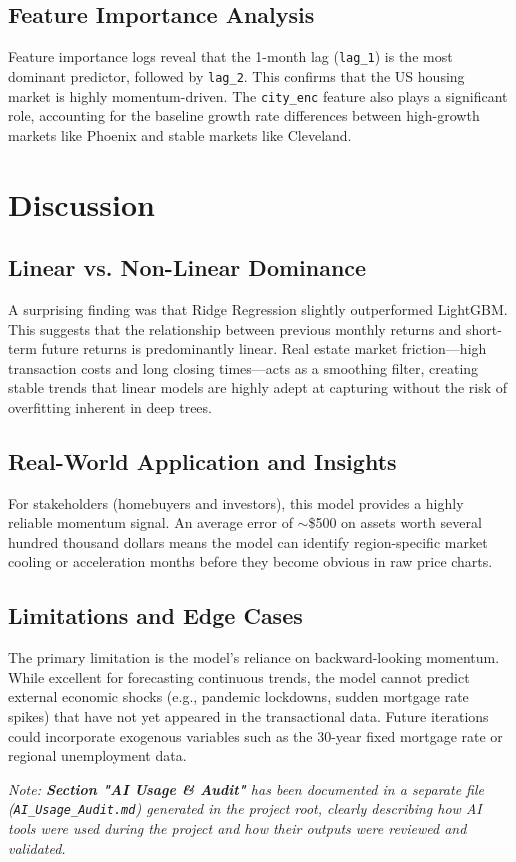 \documentclass[11pt,a4paper]{article}
\begin{document}
\subsection{Feature Importance Analysis}
Feature importance logs reveal that the 1-month lag (\texttt{lag\_1}) is the most dominant predictor, followed by \texttt{lag\_2}. This confirms that the US housing market is highly momentum-driven. The \texttt{city\_enc} feature also plays a significant role, accounting for the baseline growth rate differences between high-growth markets like Phoenix and stable markets like Cleveland.

\section{Discussion}
\label{sec:discussion}
\subsection{Linear vs. Non-Linear Dominance}
A surprising finding was that Ridge Regression slightly outperformed LightGBM. This suggests that the relationship between previous monthly returns and short-term future returns is predominantly linear. Real estate market friction---high transaction costs and long closing times---acts as a smoothing filter, creating stable trends that linear models are highly adept at capturing without the risk of overfitting inherent in deep trees.

\subsection{Real-World Application and Insights}
For stakeholders (homebuyers and investors), this model provides a highly reliable momentum signal. An average error of $\sim$\$500 on assets worth several hundred thousand dollars means the model can identify region-specific market cooling or acceleration months before they become obvious in raw price charts.

\subsection{Limitations and Edge Cases}
The primary limitation is the model's reliance on backward-looking momentum. While excellent for forecasting continuous trends, the model cannot predict external economic shocks (e.g., pandemic lockdowns, sudden mortgage rate spikes) that have not yet appeared in the transactional data. Future iterations could incorporate exogenous variables such as the 30-year fixed mortgage rate or regional unemployment data.

\vspace*{1em}
\noindent
\textit{Note: \textbf{Section "AI Usage \& Audit"} has been documented in a separate file (\texttt{AI\_Usage\_Audit.md}) generated in the project root, clearly describing how AI tools were used during the project and how their outputs were reviewed and validated.}
\end{document}

